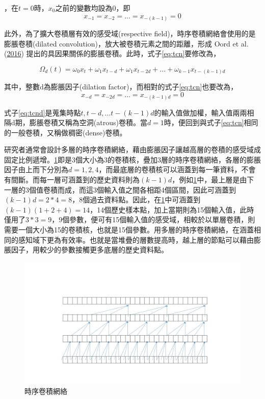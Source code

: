 \documentclass[oneside]{book}
\begin{document}
，在\(t=0\)時，\(x_0\)之前的變數均設為0，即
\begin{equation} 
   x_{-1}=x_{-2}=...=x_{-(k-1)}=0
  \label{eq:padding}
\end{equation}

此外，為了擴大卷積層有效的感受域(respective field)，時序卷積網絡會使用的是膨脹卷積(dilated convolution)，放大被卷積元素之間的距離，形成 Oord et al. (\protect\hyperlink{ref-oordWaveNetGenerativeModel2016}{2016}) 提出的具因果關係的膨脹卷積。此時，式子\eqref{eq:tcn}要修改為，

\begin{equation} 
   \Omega_d(t) = \omega_0x_t+\omega_1x_{t-d}+\omega_1x_{t-2d}+...+\omega_{k-1}x_{t-(k-1)d}
  \label{eq:tcnd}
\end{equation}

其中，整數d為膨脹因子(dilation factor)，而相對的式子\eqref{eq:tcn}也要改為，
\begin{equation} 
   x_{-d}=x_{-2d}=...=x_{-(k-1)d}=0
  \label{eq:paddingd}
\end{equation}

式子\eqref{eq:tcnd}是蒐集時點\(t,t-d,...t-(k-1)d\)的輸入值做加權，輸入值兩兩相隔d期，膨脹卷積又稱為空洞(atrous)卷積。當\(d=1\)時，便回到與式子\eqref{eq:tcn}相同的一般卷積，又稱做稠密(dense)卷積。

研究者通常會設計多層的時序卷積網絡，藉由膨脹因子讓越高層的卷積的感受域成固定比例遞增。\ref{fig:TCNmodel}即是3個大小為3的卷積核，疊加3層的時序卷積網絡，各層的膨脹因子由上而下分別為\(d=1,2,4\)，而最底層的卷積核可以涵蓋到每一筆資料，不會有間斷。而每一層可涵蓋到的歷史資料則為\((k-1)d\)，例如\ref{fig:TCNmodel}中，最上層是由下一層的3個值卷積而成，而這3個輸入值之間各相距4個區間，因此可涵蓋到\((k-1)d=2*4=8\)，8個過去資料點。因此，在\ref{fig:TCNmodel}中可涵蓋到\((k-1)(1+2+4)=14\)，14個歷史樣本點，加上當期則為15個輸入值，此時僅用了\(3*3=9\)，9個參數，便可有15個輸入值的感受域，相較於以單層卷積，則需要一個大小為15的卷積核，也就是15個參數。用多層的時序卷積網絡，在涵蓋相同的感知域下更為有效率。也就是當堆疊的層數提高時，越上層的節點可以藉由膨脹因子，用較少的參數接觸更多底層的歷史資料點。

\begin{figure}

{\centering \includegraphics[width=.6\linewidth]{./fig/TCN_model} 

}

\caption{時序卷積網絡}\label{fig:TCNmodel}
\end{figure}
\end{document}

